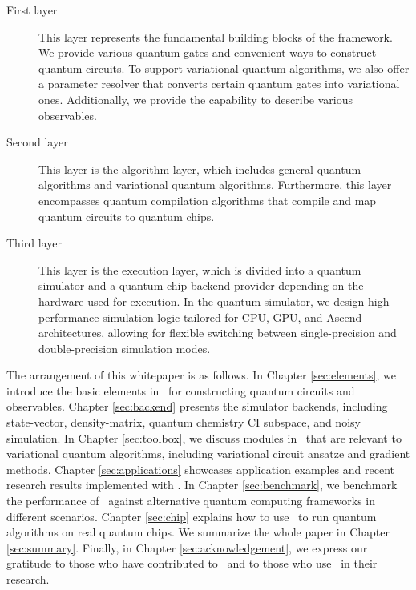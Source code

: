 \begin{description}
    \item[First layer] This layer represents the fundamental building blocks of the framework. We provide various quantum gates and convenient ways to construct quantum circuits. To support variational quantum algorithms, we also offer a parameter resolver that converts certain quantum gates into variational ones. Additionally, we provide the capability to describe various observables.
    \item[Second layer] This layer is the algorithm layer, which includes general quantum algorithms and variational quantum algorithms. Furthermore, this layer encompasses quantum compilation algorithms that compile and map quantum circuits to quantum chips.
    \item[Third layer] This layer is the execution layer, which is divided into a quantum simulator and a quantum chip backend provider depending on the hardware used for execution. In the quantum simulator, we design high-performance simulation logic tailored for CPU, GPU, and Ascend architectures, allowing for flexible switching between single-precision and double-precision simulation modes.
\end{description}

The arrangement of this whitepaper is as follows. In Chapter \hyperref[sec:elements]{\ref*{sec:elements}}, we introduce the basic elements in \MindQuantum\ for constructing quantum circuits and observables. Chapter \hyperref[sec:backend]{\ref*{sec:backend}} presents the simulator backends, including state-vector, density-matrix, quantum chemistry CI subspace, and noisy simulation. In Chapter \hyperref[sec:toolbox]{\ref*{sec:toolbox}}, we discuss modules in \MindQuantum\ that are relevant to variational quantum algorithms, including variational circuit ansatze and gradient methods. Chapter \hyperref[sec:applications]{\ref*{sec:applications}} showcases application examples and recent research results implemented with \MindQuantum. In Chapter \hyperref[sec:benchmark]{\ref*{sec:benchmark}}, we benchmark the performance of \MindQuantum\ against alternative quantum computing frameworks in different scenarios. Chapter \hyperref[sec:chip]{\ref*{sec:chip}} explains how to use \MindQuantum\ to run quantum algorithms on real quantum chips. We summarize the whole paper in Chapter \hyperref[sec:summary]{\ref*{sec:summary}}. Finally, in Chapter \hyperref[sec:acknowledgement]{\ref*{sec:acknowledgement}}, we express our gratitude to those who have contributed to \MindQuantum\ and to those who use \MindQuantum\ in their research.

